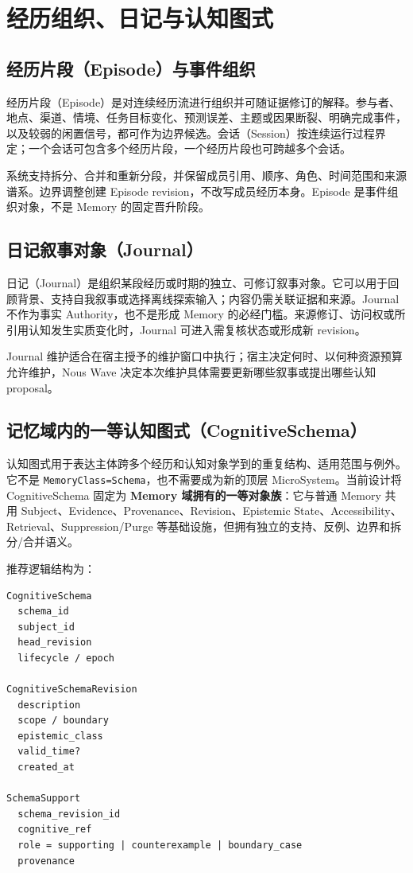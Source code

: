 \chapter{经历组织、日记与认知图式}

\section{经历片段（Episode）与事件组织}

经历片段（Episode）是对连续经历流进行组织并可随证据修订的解释。参与者、地点、渠道、情境、任务目标变化、预测误差、主题或因果断裂、明确完成事件，以及较弱的闲置信号，都可作为边界候选。会话（Session）按连续运行过程界定；一个会话可包含多个经历片段，一个经历片段也可跨越多个会话。\cite{nous-research-package}

系统支持拆分、合并和重新分段，并保留成员引用、顺序、角色、时间范围和来源谱系。边界调整创建 Episode revision，不改写成员经历本身。Episode 是事件组织对象，不是 Memory 的固定晋升阶段。

\section{日记叙事对象（Journal）}

日记（Journal）是组织某段经历或时期的独立、可修订叙事对象。它可以用于回顾背景、支持自我叙事或选择离线探索输入；内容仍需关联证据和来源。Journal 不作为事实 Authority，也不是形成 Memory 的必经门槛。来源修订、访问权或所引用认知发生实质变化时，Journal 可进入需复核状态或形成新 revision。

Journal 维护适合在宿主授予的维护窗口中执行；宿主决定何时、以何种资源预算允许维护，Nous Wave 决定本次维护具体需要更新哪些叙事或提出哪些认知 proposal。

\section{记忆域内的一等认知图式（CognitiveSchema）}

认知图式用于表达主体跨多个经历和认知对象学到的重复结构、适用范围与例外。它不是 \texttt{MemoryClass=Schema}，也不需要成为新的顶层 MicroSystem。当前设计将 CognitiveSchema 固定为 \textbf{Memory 域拥有的一等对象族}：它与普通 Memory 共用 Subject、Evidence、Provenance、Revision、Epistemic State、Accessibility、Retrieval、Suppression/Purge 等基础设施，但拥有独立的支持、反例、边界和拆分/合并语义。

推荐逻辑结构为：

\begin{lstlisting}
CognitiveSchema
  schema_id
  subject_id
  head_revision
  lifecycle / epoch

CognitiveSchemaRevision
  description
  scope / boundary
  epistemic_class
  valid_time?
  created_at

SchemaSupport
  schema_revision_id
  cognitive_ref
  role = supporting | counterexample | boundary_case
  provenance
\end{lstlisting}

